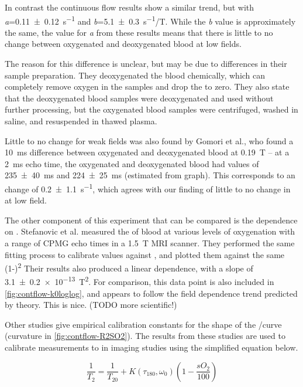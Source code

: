 In contrast the continuous flow results show a similar trend, but with \textit{a}=\SI{0.11\pm0.12}{s^{-1}} and \textit{b}=\SI{5.1\pm0.3}{s^{-1}/T}.
While the \textit{b} value is approximately the same, the value for \textit{a} from these results means that there is little to no change between oxygenated and deoxygenated blood at low fields.

The reason for this difference is unclear, but may be due to differences in their sample preparation.
They deoxygenated the blood chemically, which can completely remove oxygen in the samples and drop the \SOtwo to zero.
They also state that the deoxygenated blood samples were deoxygenated and used without further processing, but the oxygenated blood samples were centrifuged, washed in saline, and resuspended in thawed plasma.

Little to no change for weak \Bzero fields was also found by Gomori et al., who found a \SI{10}{ms} \Ttwo difference between oxygenated and deoxygenated blood at \SI{0.19}{T} \cite{GomoriNMRRelaxationTimes1987} --
at a \SI{2}{ms} echo time, the oxygenated and deoxygenated blood had \Ttwo values of \SI{235\pm40}{ms} and \SI{224\pm25}{ms} (estimated from graph).
This corresponds to an \Rtwo change of \SI{0.2\pm1.1}{s^{-1}}, which agrees with our finding of little to no change in \Rtwo at low field.

The other component of this experiment that can be compared is the dependence on \SOtwo.
Stefanovic et al. measured the \Ttwo of blood at various levels of oxygenation with a range of CPMG echo times in a \SI{1.5}{T} MRI scanner\cite{StefanovicHumanwholebloodrelaxometry2004}.
They performed the same \Kzero fitting process to calibrate \Kzero values against \SOtwo, and plotted them against the same (1-\SOtwo)\textsuperscript{2}
Their results also produced a linear dependence, with a slope of \SI{3.1\pm0.2 e-13}{T^2}.
For comparison, this data point is also included in \autoref{fig:contflow-k0loglog}, and appears to follow the field dependence trend predicted by theory.
This is nice. (TODO more scientific!)

Other studies give empirical calibration constants for the shape of the \Rtwo/\SOtwo curve (curvature in \autoref{fig:contflow-R2SO2}).
The results from these studies are used to calibrate \Ttwo measurements to \SOtwo in imaging studies using the simplified equation below.

\begin{equation}
\frac{1}{T_2} = \frac{1}{T_{20}} + K\left(\tau_{180},\omega_0\right)\left(1 - \frac{sO_2}{100}\right)
\label{eq:quadmodel}
\end{equation}

